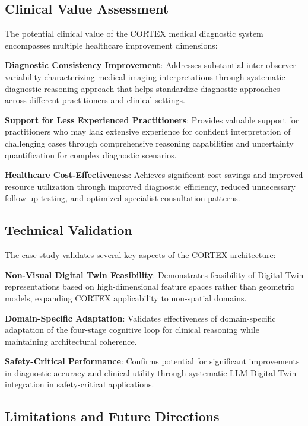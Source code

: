 \subsection{Clinical Value Assessment}

The potential clinical value of the CORTEX medical diagnostic system encompasses multiple healthcare improvement dimensions:

\textbf{Diagnostic Consistency Improvement}: Addresses substantial inter-observer variability characterizing medical imaging interpretations through systematic diagnostic reasoning approach that helps standardize diagnostic approaches across different practitioners and clinical settings.

\textbf{Support for Less Experienced Practitioners}: Provides valuable support for practitioners who may lack extensive experience for confident interpretation of challenging cases through comprehensive reasoning capabilities and uncertainty quantification for complex diagnostic scenarios.

\textbf{Healthcare Cost-Effectiveness}: Achieves significant cost savings and improved resource utilization through improved diagnostic efficiency, reduced unnecessary follow-up testing, and optimized specialist consultation patterns.

\subsection{Technical Validation}

The case study validates several key aspects of the CORTEX architecture:

\textbf{Non-Visual Digital Twin Feasibility}: Demonstrates feasibility of Digital Twin representations based on high-dimensional feature spaces rather than geometric models, expanding CORTEX applicability to non-spatial domains.

\textbf{Domain-Specific Adaptation}: Validates effectiveness of domain-specific adaptation of the four-stage cognitive loop for clinical reasoning while maintaining architectural coherence.

\textbf{Safety-Critical Performance}: Confirms potential for significant improvements in diagnostic accuracy and clinical utility through systematic LLM-Digital Twin integration in safety-critical applications.

\subsection{Limitations and Future Directions}

